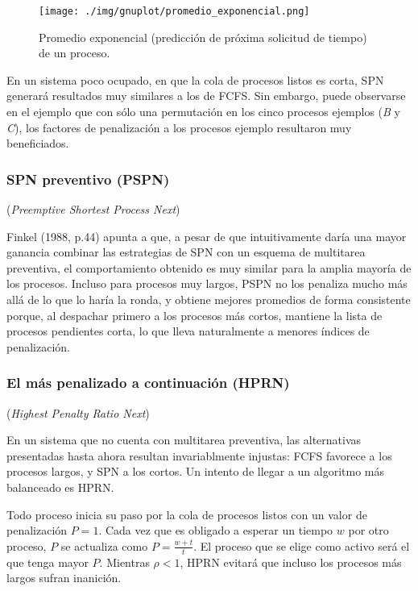 \documentclass[11pt,fleqn]{book} %
\begin{document}
\begin{figure}[htb]
\centering
\texttt{[image: ./img/gnuplot/promedio\_exponencial.png]}
\caption{\label{PLAN_promedio_exponencial}Promedio exponencial (predicción de próxima solicitud de tiempo) de un proceso.}
\end{figure}

En un sistema poco ocupado, en que la cola de procesos listos es
corta, SPN generará resultados muy similares a los de FCFS. Sin
embargo, puede observarse en el ejemplo que con sólo una permutación
en los cinco procesos ejemplos (\emph{B} y \emph{C}), los factores de
penalización a los procesos ejemplo resultaron muy beneficiados.
\subsubsection{SPN preventivo (PSPN)}
\label{sec-4-2-4-1}


(\emph{Preemptive Shortest Process Next})

Finkel (1988, p.44) apunta a que, a pesar de que intuitivamente daría
una mayor ganancia combinar las estrategias de SPN con un esquema de
multitarea preventiva, el comportamiento obtenido es muy similar para
la amplia mayoría de los procesos. Incluso para procesos muy largos,
PSPN no los penaliza mucho más allá de lo que lo haría la ronda, y
obtiene mejores promedios de forma consistente porque, al despachar
primero a los procesos más cortos, mantiene la lista de procesos
pendientes corta, lo que lleva naturalmente a menores índices de
penalización.
\subsubsection{El más penalizado a continuación (HPRN)}
\label{sec-4-2-4-2}


(\emph{Highest Penalty Ratio Next})

En un sistema que no cuenta con multitarea preventiva, las alternativas
presentadas hasta ahora resultan invariablmente injustas: FCFS
favorece a los procesos largos, y SPN a los cortos. Un intento de
llegar a un algoritmo más balanceado es HPRN.

Todo proceso inicia su paso por la cola de procesos listos con un
valor de penalización $P = 1$. Cada vez que es obligado a esperar
un tiempo $w$ por otro proceso, $P$ se actualiza como $P =
\frac{w+t}{t}$. El proceso que se elige como activo será el que
tenga mayor $P$. Mientras $\rho < 1$, HPRN evitará que incluso los
procesos más largos sufran inanición.
\end{document}
